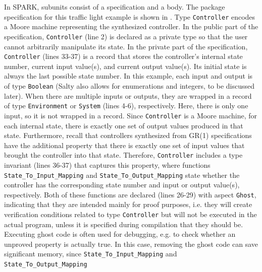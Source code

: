 \documentclass[runningheads]{llncs}
\begin{document}
In SPARK, subunits consist of a specification and a body.
The package specification for this traffic light example is shown in .
Type \lstinline{Controller} encodes a Moore machine representing the synthesized controller. 
In the public part of the specification, \lstinline{Controller} (line 2) is declared as a private type so that the user cannot arbitrarily manipulate its state.  
In the private part of the specification, \lstinline{Controller} (lines 33-37) is a record that stores the controller's internal state number, 
current input value(s), and current output value(s). 
Its initial state is always the last possible state number. 
In this example, each input and output is of type \lstinline{Boolean} (Salty also allows for enumerations and integers, to be discussed later). 
When there are multiple inputs or outputs, they are wrapped in a record of type \lstinline{Environment} or \lstinline{System} (lines 4-6), respectively. 
Here, there is only one input, so it is not wrapped in a record. 
Since \lstinline{Controller} is a Moore machine, for each internal state, 
there is exactly one set of output values produced in that state. 
Furthermore, recall that controllers synthesized from GR(1) specifications have the additional property that 
there is exactly one set of input values that brought the controller into that state. 
Therefore, \lstinline{Controller} includes a type invariant (lines 36-37) that captures this property, 
where functions \lstinline{State_To_Input_Mapping} and \lstinline{State_To_Output_Mapping} state whether the controller has the corresponding state number and input or output value(s), respectively. 
Both of these functions are declared (lines 26-29) with aspect \lstinline{Ghost}, indicating that they are intended mainly for proof purposes, 
i.e. they will create verification conditions related to type \lstinline{Controller} but will not be executed in the actual program, 
unless it is specified during compilation that they should be.
Executing ghost code is often used for debugging, e.g. to check whether an unproved property is actually true. 
In this case, removing the ghost code can save significant memory, 
since \lstinline{State_To_Input_Mapping} and \lstinline{State_To_Output_Mapping} 
\end{document}
